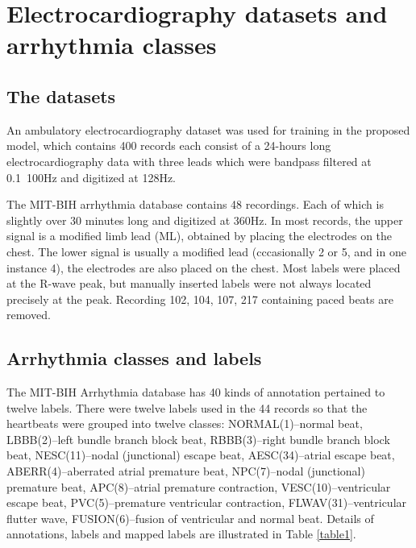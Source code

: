 \documentclass[conference]{IEEEtran}
\begin{document}
\section{Electrocardiography datasets and arrhythmia classes}

\subsection{The datasets}

An ambulatory electrocardiography dataset was used for training in the proposed model, which contains 400 records each consist of a 24-hours long electrocardiography data with three leads which were bandpass filtered at 0.1~100Hz and digitized at 128Hz.

The MIT-BIH arrhythmia database \cite{Goldberger} contains 48 recordings. Each of which is slightly over 30 minutes long and digitized at 360Hz. 
In most records, the upper signal is a modified limb lead \uppercase\expandafter{}(ML\uppercase\expandafter{}), obtained by placing the electrodes on the chest. The lower signal is usually a modified lead \uppercase\expandafter{}(cccasionally \uppercase\expandafter{}2 or \uppercase\expandafter{}5, and in one instance \uppercase\expandafter{}4), the electrodes are also placed on the chest. Most labels were placed at the R-wave peak, but manually inserted labels were not always located precisely at the peak. Recording 102, 104, 107, 217 containing paced beats are removed.


\subsection{Arrhythmia classes and labels}
The MIT-BIH Arrhythmia database \cite{Goldberger} has 40 kinds of annotation pertained to twelve labels. There were twelve labels used in the 44 records so that the heartbeats were grouped into twelve classes: NORMAL(1)--normal beat, LBBB(2)--left bundle branch block beat, RBBB(3)--right bundle branch block beat, NESC(11)--nodal (junctional) escape beat, AESC(34)--atrial escape beat, ABERR(4)--aberrated atrial premature beat, NPC(7)--nodal (junctional) premature beat, APC(8)--atrial premature contraction, VESC(10)--ventricular escape beat, PVC(5)--premature ventricular contraction, FLWAV(31)--ventricular flutter wave, FUSION(6)--fusion of ventricular and normal beat. Details of annotations, labels and mapped labels are illustrated in Table \ref{table1}.
\end{document}

